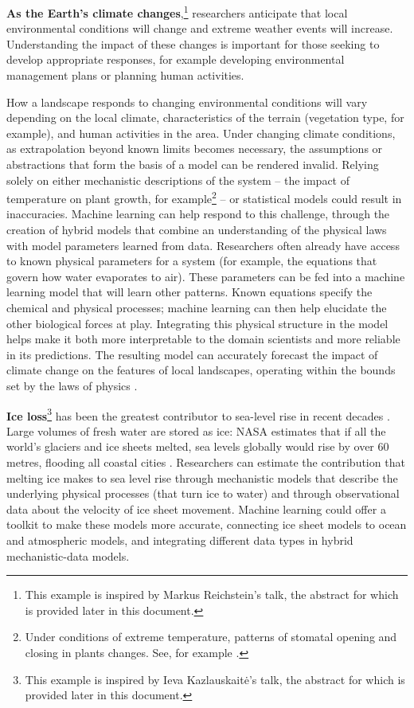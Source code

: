 \noindent\textbf{As the Earth's climate changes},\footnote{This example is
  inspired by Markus Reichstein's talk, the abstract for which is
  provided later in this document.} researchers anticipate that local
environmental conditions will change and extreme weather events will
increase. Understanding the impact of these changes is important for
those seeking to develop appropriate responses, for example developing
environmental management plans or planning human activities.

How a landscape responds to changing environmental conditions will vary
depending on the local climate, characteristics of the terrain
(vegetation type, for example), and human activities in the area. Under
changing climate conditions, as extrapolation beyond known limits
becomes necessary, the assumptions or abstractions that form the basis
of a model can be rendered invalid. Relying solely on either mechanistic
descriptions of the system -- the impact of temperature on plant growth,
for example\footnote{Under conditions of extreme temperature, patterns
  of stomatal opening and closing in plants changes. See, for example \cite{Marchin-extreme22}.} -- or statistical models could
result in inaccuracies. Machine learning can help respond to this
challenge, through the creation of hybrid models that combine an
understanding of the physical laws with model parameters learned from
data. Researchers often already have access to known physical parameters
for a system (for example, the equations that govern how water
evaporates to air). These parameters can be fed into a machine learning
model that will learn other patterns. Known equations specify the
chemical and physical processes; machine learning can then help
elucidate the other biological forces at play. Integrating this physical
structure in the model helps make it both more interpretable to the
domain scientists and more reliable in its predictions. The resulting
model can accurately forecast the impact of climate change on the
features of local landscapes, operating within the bounds set by the
laws of physics \cite{Requena-predicting19}.

\noindent\textbf{Ice loss}\footnote{This example is inspired by Ieva
Kazlauskaitė's talk, the abstract for which is provided later in this
document.} has been the greatest contributor to sea-level rise in
recent decades \cite{Portner-ipcc19}. Large volumes of fresh water
are stored as ice: NASA estimates that if all the world's glaciers and
ice sheets melted, sea levels globally would rise by over 60 metres,
flooding all coastal cities \cite{NASA-understanding}. Researchers
can estimate the contribution that melting ice makes to sea level rise
through mechanistic models that describe the underlying physical
processes (that turn ice to water) and through observational data
about the velocity of ice sheet movement. Machine learning could offer
a toolkit to make these models more accurate, connecting ice sheet
models to ocean and atmospheric models, and integrating different data
types in hybrid mechanistic-data models.

